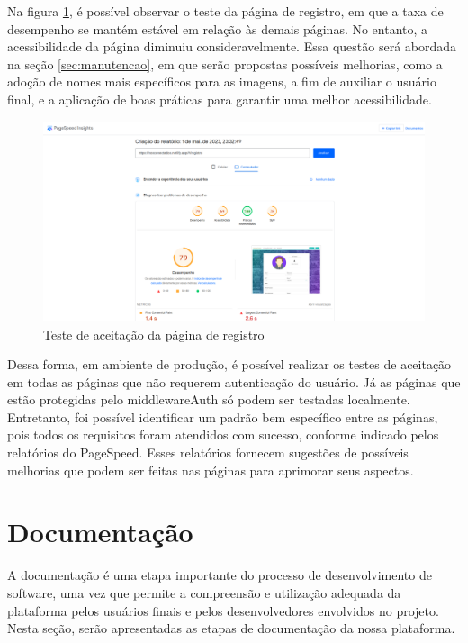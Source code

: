 \documentclass[tcc,capa]{texufpel}
\begin{document}
Na figura \ref{teste-registro}, é possível observar o teste da página de registro, em que a taxa de desempenho se mantém estável em relação às demais páginas. No entanto, a acessibilidade da página diminuiu consideravelmente. Essa questão será abordada na seção \ref{sec:manutencao}, em que serão propostas possíveis melhorias, como a adoção de nomes mais específicos para as imagens, a fim de auxiliar o usuário final, e a aplicação de boas práticas para garantir uma melhor acessibilidade.
\begin{figure}[htbp]
  \centering \includegraphics[scale=.25]{assets/testeregistro.png}
  \caption{Teste de aceitação da página de registro}
  \label{teste-registro}
\end{figure}
\newpage
Dessa forma, em ambiente de produção, é possível realizar os testes de aceitação em todas as páginas que não requerem autenticação do usuário. Já as páginas que estão protegidas pelo middlewareAuth só podem ser testadas localmente. Entretanto, foi possível identificar um padrão bem específico entre as páginas, pois todos os requisitos foram atendidos com sucesso, conforme indicado pelos relatórios do PageSpeed. Esses relatórios fornecem sugestões de possíveis melhorias que podem ser feitas nas páginas para aprimorar seus aspectos.


\section{Documentação}
\label{sec:documentacao}
A documentação é uma etapa importante do processo de desenvolvimento de software, uma vez que permite a compreensão e utilização adequada da plataforma pelos usuários finais e pelos desenvolvedores envolvidos no projeto. Nesta seção, serão apresentadas as etapas de documentação da nossa plataforma.
\end{document}
